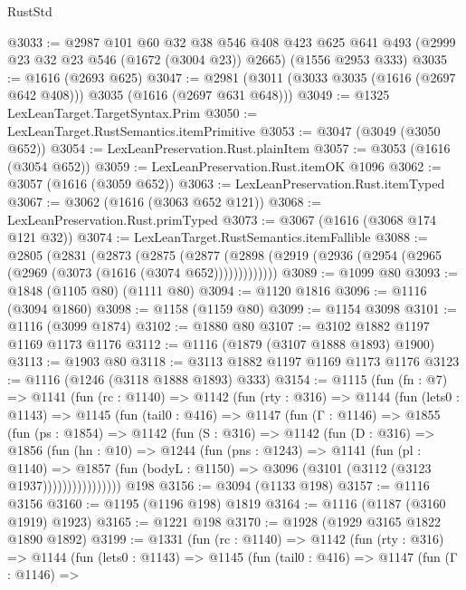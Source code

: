 \begin{lexlean}{RustStd}
\begin{coremodule}
@3033 := @2987
    @101
    @60
    @32
    @38
    @546
    @408
    @423
    @625
    @641
    @493
    (@2999 @23 @32 @23 @546 (@1672 (@3004 @23)) @2665)
    (@1556 @2953 @333)
@3035 := @1616 (@2693 @625)
@3047 := @2981 (@3011 (@3033 @3035 (@1616 (@2697 @642 @408))) @3035 (@1616 (@2697 @631 @648)))
@3049 := @1325 LexLeanTarget.TargetSyntax.Prim
@3050 := LexLeanTarget.RustSemantics.itemPrimitive
@3053 := @3047 (@3049 (@3050 @652))
@3054 := LexLeanPreservation.Rust.plainItem
@3057 := @3053 (@1616 (@3054 @652))
@3059 := LexLeanPreservation.Rust.itemOK @1096
@3062 := @3057 (@1616 (@3059 @652))
@3063 := LexLeanPreservation.Rust.itemTyped
@3067 := @3062 (@1616 (@3063 @652 @121))
@3068 := LexLeanPreservation.Rust.primTyped
@3073 := @3067 (@1616 (@3068 @174 @121 @32))
@3074 := LexLeanTarget.RustSemantics.itemFallible
@3088 := @2805
    (@2831
      (@2873
        (@2875
          (@2877 (@2898 (@2919 (@2936 (@2954 (@2965 (@2969 (@3073 (@1616 (@3074 @652)))))))))))))
@3089 := @1099 @80
@3093 := @1848 (@1105 @80) (@1111 @80)
@3094 := @1120 @1816
@3096 := @1116 (@3094 @1860)
@3098 := @1158 (@1159 @80)
@3099 := @1154 @3098
@3101 := @1116 (@3099 @1874)
@3102 := @1880 @80
@3107 := @3102 @1882 @1197 @1169 @1173 @1176
@3112 := @1116 (@1879 (@3107 @1888 @1893) @1900)
@3113 := @1903 @80
@3118 := @3113 @1882 @1197 @1169 @1173 @1176
@3123 := @1116 (@1246 (@3118 @1888 @1893) @333)
@3154 := @1115
    (fun (fn : @7) =>
    @1141
      (fun (rc : @1140) =>
      @1142
        (fun (rty : @316) =>
        @1144
          (fun (lets0 : @1143) =>
          @1145
            (fun (tail0 : @416) =>
            @1147
              (fun (Γ : @1146) =>
              @1855
                (fun (ps : @1854) =>
                @1142
                  (fun (S : @316) =>
                  @1142
                    (fun (D : @316) =>
                    @1856
                      (fun (hn : @10) =>
                      @1244
                        (fun (pns : @1243) =>
                        @1141
                          (fun (pl : @1140) =>
                          @1857
                            (fun (bodyL : @1150) => @3096 (@3101 (@3112 (@3123 @1937))))))))))))))))
    @198
@3156 := @3094 (@1133 @198)
@3157 := @1116 @3156
@3160 := @1195 (@1196 @198) @1819
@3164 := @1116 (@1187 (@3160 @1919) @1923)
@3165 := @1221 @198
@3170 := @1928 (@1929 @3165 @1822 @1890 @1892)
@3199 := @1331
    (fun (rc : @1140) =>
    @1142
      (fun (rty : @316) =>
      @1144
        (fun (lets0 : @1143) =>
        @1145
          (fun (tail0 : @416) =>
          @1147
            (fun (Γ : @1146) =>

\end{coremodule}
\end{lexlean}
